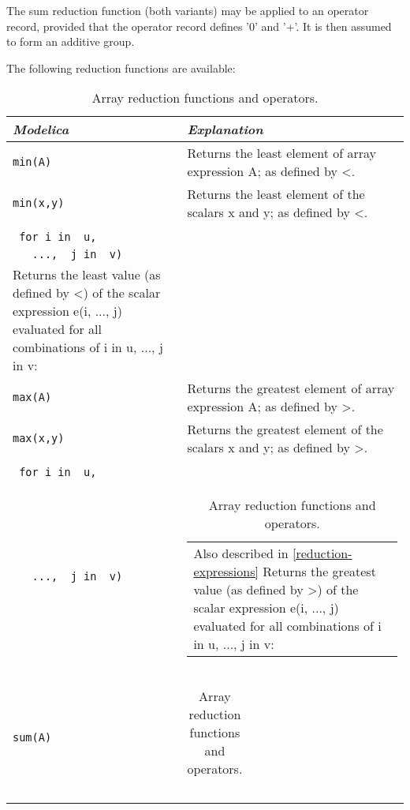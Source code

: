 The sum reduction function (both variants) may be applied to an operator
record, provided that the operator record defines '0' and '+'. It is
then assumed to form an additive group.

The following reduction functions are available:

\begin{longtable}{|p{4.1cm}|p{10.1cm}|}
\caption{Array reduction functions and operators.}\\
\hline
\emph{Modelica} & \emph{Explanation}\\ \hline
\endhead
\lstinline!min(A)!
&
Returns the least element of array expression A; as defined by
\textless{}.\\ \hline
\lstinline!min(x,y)!
&
Returns the least element of the scalars x and y; as defined by
\textless{}.\\ \hline
\begin{tabular}{@{}p{4cm}@{}}
\lstinline!min(e(i, ..., j)!\\
\lstinline! for i in  u,!\\
\lstinline!   ...,  j in  v)!
\end{tabular}
&
\begin{tabular}{@{}p{10cm}@{}}
Also described in \autoref{reduction-expressions}\\
Returns the least value (as defined by \textless{}) of the scalar
expression e(i, ..., j) evaluated for all combinations of i in u, ..., j
in v:
\end{tabular}\\ \hline
\lstinline!max(A)!
&
Returns the greatest element of array expression A; as defined by
\textgreater{}.\\ \hline
\lstinline!max(x,y)!
&
Returns the greatest element of the scalars x and y; as defined by
\textgreater{}.\\ \hline
\begin{tabular}{@{}p{4cm}@{}}
\lstinline!max(e(i, ..., j)!\\
\lstinline! for i in  u,!\\
\lstinline!   ...,  j in  v)!
\end{tabular}
&
\begin{tabular}{@{}p{10cm}@{}}
Also described in \autoref{reduction-expressions}
Returns the greatest value (as defined by \textgreater{}) of the scalar
expression e(i, ..., j) evaluated for all combinations of i in u, ..., j
in v:
\end{tabular}\\ \hline
\lstinline!sum(A)!
&
\begin{tabular}{@{}p{10cm}@{}}

\end{tabular}
\end{longtable}
